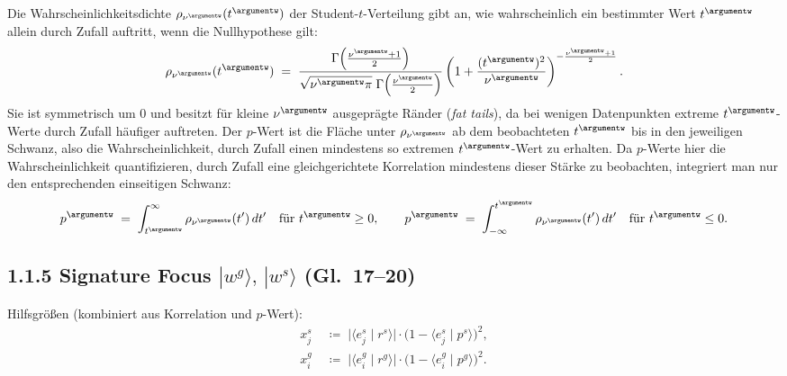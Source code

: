 Die Wahrscheinlichkeitsdichte $\rho_{\nu^{\argumentw}}(t^{\argumentw})$ der
Student-$t$-Verteilung gibt an, wie wahrscheinlich ein bestimmter
Wert $t^{\argumentw}$ allein durch Zufall auftritt, wenn die Nullhypothese gilt:
\begin{equation}
    \rho_{\nu^{\argumentw}}(t^{\argumentw})
    \;=\;
    \frac{\,\Gamma\!\left(\tfrac{\nu^{\argumentw}+1}{2}\right)\,}
         {\sqrt{\nu^{\argumentw}\pi}\;\Gamma\!\left(\tfrac{\nu^{\argumentw}}{2}\right)}
    \left(1 + \frac{(t^{\argumentw})^2}{\nu^{\argumentw}}\right)^{-\frac{\nu^{\argumentw}+1}{2}}.
\end{equation}
Sie ist symmetrisch um $0$ und besitzt für kleine $\nu^{\argumentw}$ ausgeprägte
Ränder (\emph{fat tails}), da bei wenigen Datenpunkten
extreme $t^{\argumentw}$-Werte durch Zufall häufiger auftreten. Der $p$-Wert ist
die Fläche unter $\rho_{\nu^{\argumentw}}$ ab dem beobachteten $t^{\argumentw}$ bis in den
jeweiligen Schwanz, also die Wahrscheinlichkeit, durch Zufall einen
mindestens so extremen $t^{\argumentw}$-Wert zu erhalten. Da $p$-Werte hier die
Wahrscheinlichkeit quantifizieren, durch Zufall eine gleichgerichtete
Korrelation mindestens dieser Stärke zu beobachten, integriert man
nur den entsprechenden einseitigen Schwanz:
\begin{equation}
    p^{\argumentw}
    \;=\;
    \int_{t^{\argumentw}}^{\infty} \rho_{\nu^{\argumentw}}(t')\,dt'
    \quad \text{für } t^{\argumentw} \ge 0,
    \qquad
    p^{\argumentw}
    \;=\;
    \int_{-\infty}^{t^{\argumentw}} \rho_{\nu^{\argumentw}}(t')\,dt'
    \quad \text{für } t^{\argumentw} \le 0.
\end{equation}
 
\subsection*{1.1.5 Signature Focus $|w^g\rangle,\,|w^s\rangle$ (Gl.~17--20)}
 
Hilfsgr\"{o}{\ss}en (kombiniert aus Korrelation und $p$-Wert):
\begin{align}
    x^s_j &\;\coloneqq\; \bigl|\langle e^s_j \mid r^s \rangle\bigr|
                        \cdot \bigl(1 - \langle e^s_j \mid p^s \rangle\bigr)^2,
    \\[4pt]
    x^g_i &\;\coloneqq\; \bigl|\langle e^g_i \mid r^g \rangle\bigr|
                        \cdot \bigl(1 - \langle e^g_i \mid p^g \rangle\bigr)^2.
\end{align}
 
